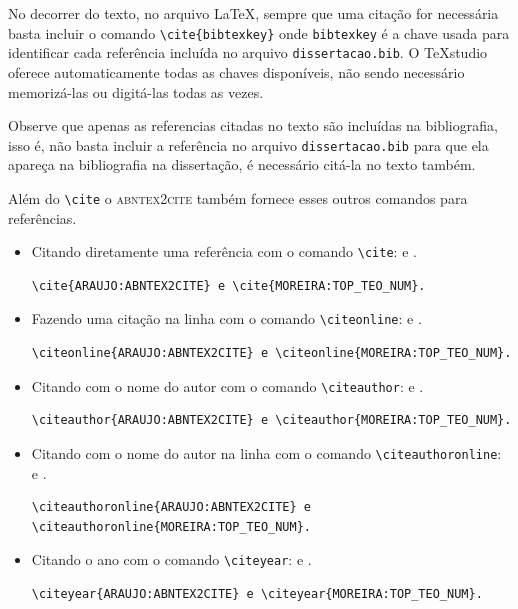 \documentclass[fleqn]{icat-ufal}
\newcommand{\TeXstudio}{\TeX\textsf{studio}}
\newcommand{\bibfile}  {\texttt{dissertacao.bib}}
\begin{document}
No decorrer do texto, no arquivo \LaTeX{}, sempre que uma citação for necessária
basta incluir o comando \lstinline!\cite{bibtexkey}! onde \lstinline!bibtexkey! é 
a chave usada para identificar cada referência incluída no arquivo 
\bibfile{}. O \TeXstudio{} oferece automaticamente todas as chaves disponíveis, 
não sendo necessário memorizá-las ou digitá-las todas as vezes.

Observe que apenas as referencias citadas no texto são incluídas na bibliografia,
isso é, não basta incluir a referência no arquivo \bibfile{}
para que ela apareça na bibliografia na dissertação, é necessário citá-la
no texto também. 

Além do \lstinline!\cite! o \textsc{abntex2cite} também fornece esses outros comandos
para referências.
\begin{itemize}
\item Citando diretamente uma referência com o comando \lstinline|\cite|: 
\cite{ARAUJO:ABNTEX2CITE} e \cite{MOREIRA:TOP_TEO_NUM}.
\begin{lstlisting}
\cite{ARAUJO:ABNTEX2CITE} e \cite{MOREIRA:TOP_TEO_NUM}.
\end{lstlisting}

\item Fazendo uma citação na linha com o comando \lstinline|\citeonline|: 
 e .
\begin{lstlisting}
\citeonline{ARAUJO:ABNTEX2CITE} e \citeonline{MOREIRA:TOP_TEO_NUM}.
\end{lstlisting}

\item Citando com o nome do autor com o comando \lstinline|\citeauthor|: 
\citeauthor{ARAUJO:ABNTEX2CITE} e \citeauthor{MOREIRA:TOP_TEO_NUM}.
\begin{lstlisting}
\citeauthor{ARAUJO:ABNTEX2CITE} e \citeauthor{MOREIRA:TOP_TEO_NUM}.
\end{lstlisting}

\item Citando com o nome do autor na linha com o comando \lstinline|\citeauthoronline|: 
 e .
\begin{lstlisting}
\citeauthoronline{ARAUJO:ABNTEX2CITE} e 
\citeauthoronline{MOREIRA:TOP_TEO_NUM}.
\end{lstlisting}

\item Citando o ano com o comando \lstinline|\citeyear|: 
\citeyear{ARAUJO:ABNTEX2CITE} e \citeyear{MOREIRA:TOP_TEO_NUM}.
\begin{lstlisting}
\citeyear{ARAUJO:ABNTEX2CITE} e \citeyear{MOREIRA:TOP_TEO_NUM}.
\end{lstlisting}
\end{itemize}
\end{document}

